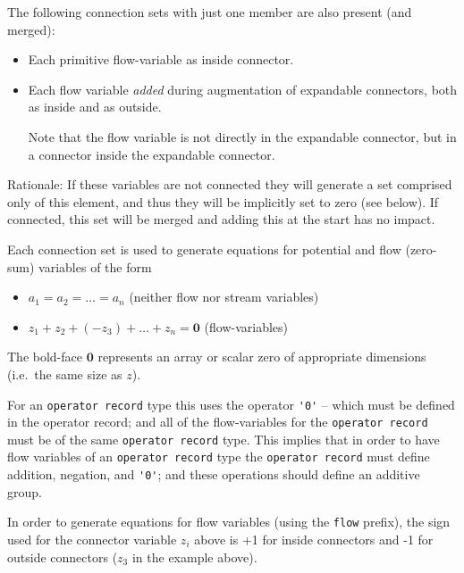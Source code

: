 The following connection sets with just one member are also present (and
merged):
\begin{itemize}
\item
  Each primitive flow-variable as inside connector.
\item
  Each flow variable \emph{added} during augmentation of expandable
  connectors, both as inside and as outside.
  \begin{nonnormative}
  Note that the flow variable is not directly in the expandable connector, but in a connector inside the expandable connector.
  \end{nonnormative}
\end{itemize}

\begin{nonnormative}
Rationale: If these variables are not connected they will
generate a set comprised only of this element, and thus they will be
implicitly set to zero (see below). If connected, this set will be
merged and adding this at the start has no impact.
\end{nonnormative}

Each connection set is used to generate equations for potential and flow
(zero-sum) variables of the form
\begin{itemize}
\item
$a_{1} = a_{2} = \ldots = a_{n}$ (neither flow nor stream variables)
\item
$z_{1} + z_{2} + (-z_{3}) + \ldots + z_{n} = \mathbf{0}$ (flow-variables)
\end{itemize}

The bold-face $\mathbf{0}$ represents an array or scalar zero of
appropriate dimensions (i.e.\ the same size as $z$).

For an \lstinline!operator record! type this uses the operator \lstinline!'0'! -- which must be
defined in the operator record; and all of the flow-variables for the
\lstinline!operator record! must be of the same \lstinline!operator record! type. This implies
that in order to have flow variables of an \lstinline!operator record! type the
\lstinline!operator record! must define addition, negation, and \lstinline!'0'!; and these
operations should define an additive group.

In order to generate equations for flow variables (using the
\lstinline!flow! prefix), the sign used for the connector variable
$z_{i}$ above is +1 for inside connectors and -1 for outside
connectors ($z_{3}$ in the example above).

